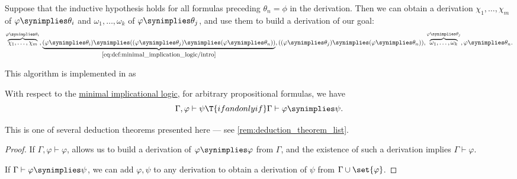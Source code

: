 \begin{algorithm}
\begin{thmenum}
    Suppose that the inductive hypothesis holds for all formulas preceding \( \theta_n = \phi \) in the derivation. Then we can obtain a derivation \( \chi_1, \ldots, \chi_m \) of \( \varphi \synimplies \theta_i \) and \( \omega_1, \ldots, \omega_k \) of \( \varphi \synimplies \theta_j \), and use them to build a derivation of our goal:
    \small
    \begin{equation*}
      \overbrace{\chi_1, \ldots, \chi_m}^{\varphi \synimplies \theta_i},
      \underbrace{(\varphi \synimplies \theta_i) \synimplies ((\varphi \synimplies \theta_j) \synimplies (\varphi \synimplies \theta_n))}_{\eqref{eq:def:minimal_implication_logic/intro}},
      ((\varphi \synimplies \theta_j) \synimplies (\varphi \synimplies \theta_n)),
      \overbrace{\omega_1, \ldots, \omega_k}^{\varphi \synimplies \theta_j},
      \varphi \synimplies \theta_n.
    \end{equation*}
    \normalsize
  \end{thmenum}
\end{algorithm}
\begin{comments}
  \item This algorithm is implemented in \cite{notebook:code} as
  \begin{CodeRefDisplay}
  \end{CodeRefDisplay}
\end{comments}

\begin{theorem}\label{thm:implicational_syntactic_deduction_theorem}
  With respect to the \hyperref[def:minimal_implication_logic]{minimal implicational logic}, for arbitrary propositional formulas, we have
  \begin{equation*}
    \Gamma, \varphi \vdash \psi \T{if and only if} \Gamma \vdash \varphi \synimplies \psi.
  \end{equation*}
\end{theorem}
\begin{comments}
  \item This is one of several deduction theorems presented here --- see \cref{rem:deduction_theorem_list}.
\end{comments}
\begin{proof}
  \SufficiencySubProof If \( \Gamma, \varphi \vdash \varphi \),  allows us to build a derivation of \( \varphi \synimplies \varphi \) from \( \Gamma \), and the existence of such a derivation implies \( \Gamma \vdash \varphi \).

  \NecessitySubProof If \( \Gamma \vdash \varphi \synimplies \psi \), we can add \( \varphi, \psi \) to any derivation to obtain a derivation of \( \psi \) from \( \Gamma \cup \set{ \varphi } \).
\end{proof}


